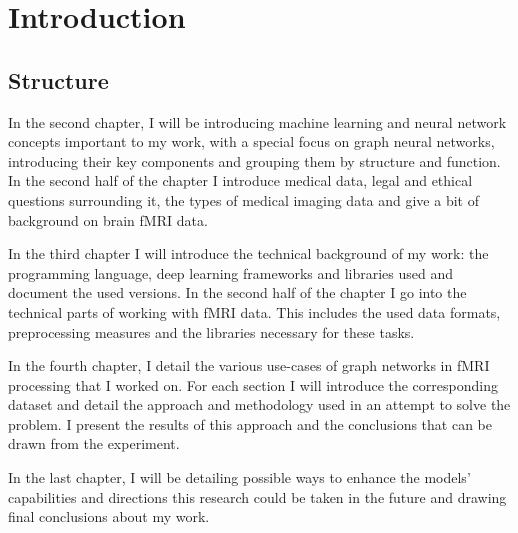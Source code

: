 \chapter{Introduction}


\section{Structure}

In the second chapter, I will be introducing machine learning and neural network concepts important to my work, with a special focus on graph neural networks, introducing their key components and grouping them by structure and function. In the second half of the chapter I introduce medical data, legal and ethical questions surrounding it, the types of medical imaging data and give a bit of background on brain fMRI data.

In the third chapter I will introduce the technical background of my work: the programming language, deep learning frameworks and libraries used and document the used versions. In the second half of the chapter I go into the technical parts of working with fMRI data. This includes the used data formats, preprocessing measures and the libraries necessary for these tasks.

In the fourth chapter, I detail the various use-cases of graph networks in fMRI processing that I worked on. For each section I will introduce the corresponding dataset and detail the approach and methodology used in an attempt to solve the problem. I present the results of this approach and the conclusions that can be drawn from the experiment.

In the last chapter, I will be detailing possible ways to enhance the models’ capabilities
and directions this research could be taken in the future and drawing final conclusions about my work.